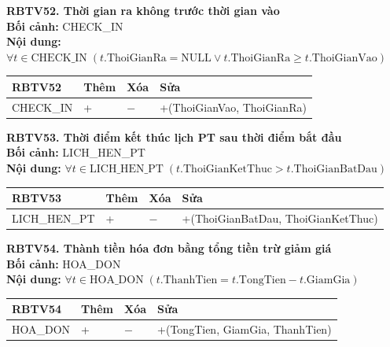 \documentclass[11pt, a4paper]{article}
\begin{document}
\vspace{0.8em}
\textbf{RBTV52. Thời gian ra không trước thời gian vào} \\
\textbf{Bối cảnh:} CHECK\_IN \\
\textbf{Nội dung:} $\forall t \in \text{CHECK\_IN} \; (t.\text{ThoiGianRa} = \text{NULL} \lor t.\text{ThoiGianRa} \ge t.\text{ThoiGianVao})$

\vspace{0.3em}
\begin{small}
\begin{tabularx}{\textwidth}{| C{4.2cm} | C{2cm} | C{2cm} | Y |}
\hline
\textbf{RBTV52} & \textbf{Thêm} & \textbf{Xóa} & \textbf{Sửa} \\
\hline
CHECK\_IN & + & $-$ & +(ThoiGianVao, ThoiGianRa) \\
\hline
\end{tabularx}
\end{small}

\vspace{0.8em}
\textbf{RBTV53. Thời điểm kết thúc lịch PT sau thời điểm bắt đầu} \\
\textbf{Bối cảnh:} LICH\_HEN\_PT \\
\textbf{Nội dung:} $\forall t \in \text{LICH\_HEN\_PT} \; (t.\text{ThoiGianKetThuc} > t.\text{ThoiGianBatDau})$

\vspace{0.3em}
\begin{small}
\begin{tabularx}{\textwidth}{| C{4.2cm} | C{2cm} | C{2cm} | Y |}
\hline
\textbf{RBTV53} & \textbf{Thêm} & \textbf{Xóa} & \textbf{Sửa} \\
\hline
LICH\_HEN\_PT & + & $-$ & +(ThoiGianBatDau, ThoiGianKetThuc) \\
\hline
\end{tabularx}
\end{small}

\vspace{0.8em}
\textbf{RBTV54. Thành tiền hóa đơn bằng tổng tiền trừ giảm giá} \\
\textbf{Bối cảnh:} HOA\_DON \\
\textbf{Nội dung:} $\forall t \in \text{HOA\_DON} \; (t.\text{ThanhTien} = t.\text{TongTien} - t.\text{GiamGia})$

\vspace{0.3em}
\begin{small}
\begin{tabularx}{\textwidth}{| C{4.2cm} | C{2cm} | C{2cm} | Y |}
\hline
\textbf{RBTV54} & \textbf{Thêm} & \textbf{Xóa} & \textbf{Sửa} \\
\hline
HOA\_DON & + & $-$ & +(TongTien, GiamGia, ThanhTien) \\
\hline
\end{tabularx}
\end{small}
\end{document}
